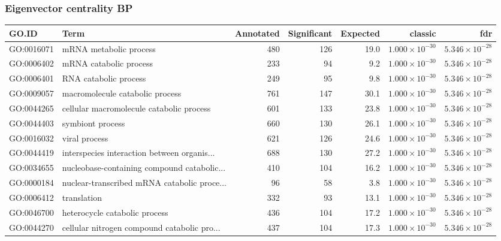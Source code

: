 \subsubsection{Eigenvector centrality BP}
\begin{table}[ht]
\centering
\begin{adjustbox}{width=\textwidth}
\begin{tabular}{llrrrrr}
  \hline
GO.ID & Term & Annotated & Significant & Expected & classic & fdr \\ 
  \hline
GO:0016071 & mRNA metabolic process & 480 & 126 & 19.0 & $1.000 \times 10^{-30}$ & $5.346 \times 10^{-28}$ \\ 
  GO:0006402 & mRNA catabolic process & 233 & 94 & 9.2 & $1.000 \times 10^{-30}$ & $5.346 \times 10^{-28}$ \\ 
  GO:0006401 & RNA catabolic process & 249 & 95 & 9.8 & $1.000 \times 10^{-30}$ & $5.346 \times 10^{-28}$ \\ 
  GO:0009057 & macromolecule catabolic process & 761 & 147 & 30.1 & $1.000 \times 10^{-30}$ & $5.346 \times 10^{-28}$ \\ 
  GO:0044265 & cellular macromolecule catabolic process & 601 & 133 & 23.8 & $1.000 \times 10^{-30}$ & $5.346 \times 10^{-28}$ \\ 
  GO:0044403 & symbiont process & 660 & 130 & 26.1 & $1.000 \times 10^{-30}$ & $5.346 \times 10^{-28}$ \\ 
  GO:0016032 & viral process & 621 & 126 & 24.6 & $1.000 \times 10^{-30}$ & $5.346 \times 10^{-28}$ \\ 
  GO:0044419 & interspecies interaction between organis... & 688 & 130 & 27.2 & $1.000 \times 10^{-30}$ & $5.346 \times 10^{-28}$ \\ 
  GO:0034655 & nucleobase-containing compound catabolic... & 410 & 104 & 16.2 & $1.000 \times 10^{-30}$ & $5.346 \times 10^{-28}$ \\ 
  GO:0000184 & nuclear-transcribed mRNA catabolic proce... & 96 & 58 & 3.8 & $1.000 \times 10^{-30}$ & $5.346 \times 10^{-28}$ \\ 
  GO:0006412 & translation & 332 & 93 & 13.1 & $1.000 \times 10^{-30}$ & $5.346 \times 10^{-28}$ \\ 
  GO:0046700 & heterocycle catabolic process & 436 & 104 & 17.2 & $1.000 \times 10^{-30}$ & $5.346 \times 10^{-28}$ \\ 
  GO:0044270 & cellular nitrogen compound catabolic pro... & 437 & 104 & 17.3 & $1.000 \times 10^{-30}$ & $5.346 \times 10^{-28}$ \\ 

\end{tabular}
\end{adjustbox}
\end{table}
